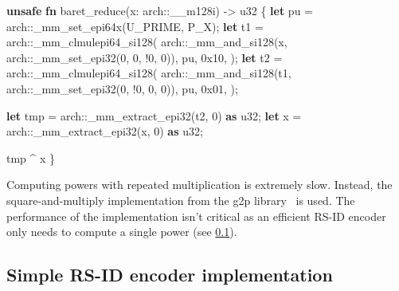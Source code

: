 \documentclass[
]{article}
\newenvironment{Shaded}{}{}
\newcommand{\DataTypeTok}[1]{\textcolor[rgb]{0.56,0.13,0.00}{#1}}
\newcommand{\DecValTok}[1]{\textcolor[rgb]{0.25,0.63,0.44}{#1}}
\newcommand{\KeywordTok}[1]{\textcolor[rgb]{0.00,0.44,0.13}{\textbf{#1}}}
\newcommand{\NormalTok}[1]{#1}
\newcommand{\OperatorTok}[1]{\textcolor[rgb]{0.40,0.40,0.40}{#1}}
\newcommand{\PreprocessorTok}[1]{\textcolor[rgb]{0.74,0.48,0.00}{#1}}
\begin{document}
\begin{Shaded}
\begin{Highlighting}[]
\KeywordTok{unsafe} \KeywordTok{fn}\NormalTok{ baret\_reduce(x}\OperatorTok{:} \PreprocessorTok{arch::}\NormalTok{\_\_m128i) }\OperatorTok{{-}\textgreater{}} \DataTypeTok{u32} \OperatorTok{\{}
    \KeywordTok{let}\NormalTok{ pu }\OperatorTok{=} \PreprocessorTok{arch::}\NormalTok{\_mm\_set\_epi64x(U\_PRIME}\OperatorTok{,}\NormalTok{ P\_X)}\OperatorTok{;}
    \KeywordTok{let}\NormalTok{ t1 }\OperatorTok{=} \PreprocessorTok{arch::}\NormalTok{\_mm\_clmulepi64\_si128(}
        \PreprocessorTok{arch::}\NormalTok{\_mm\_and\_si128(x}\OperatorTok{,} \PreprocessorTok{arch::}\NormalTok{\_mm\_set\_epi32(}\DecValTok{0}\OperatorTok{,} \DecValTok{0}\OperatorTok{,} \OperatorTok{!}\DecValTok{0}\OperatorTok{,} \DecValTok{0}\NormalTok{))}\OperatorTok{,}
\NormalTok{        pu}\OperatorTok{,}
        \DecValTok{0x10}\OperatorTok{,}
\NormalTok{    )}\OperatorTok{;}
    \KeywordTok{let}\NormalTok{ t2 }\OperatorTok{=} \PreprocessorTok{arch::}\NormalTok{\_mm\_clmulepi64\_si128(}
        \PreprocessorTok{arch::}\NormalTok{\_mm\_and\_si128(t1}\OperatorTok{,} \PreprocessorTok{arch::}\NormalTok{\_mm\_set\_epi32(}\DecValTok{0}\OperatorTok{,} \OperatorTok{!}\DecValTok{0}\OperatorTok{,} \DecValTok{0}\OperatorTok{,} \DecValTok{0}\NormalTok{))}\OperatorTok{,}
\NormalTok{        pu}\OperatorTok{,}
        \DecValTok{0x01}\OperatorTok{,}
\NormalTok{    )}\OperatorTok{;}

    \KeywordTok{let}\NormalTok{ tmp }\OperatorTok{=} \PreprocessorTok{arch::}\NormalTok{\_mm\_extract\_epi32(t2}\OperatorTok{,} \DecValTok{0}\NormalTok{) }\KeywordTok{as} \DataTypeTok{u32}\OperatorTok{;}
    \KeywordTok{let}\NormalTok{ x }\OperatorTok{=} \PreprocessorTok{arch::}\NormalTok{\_mm\_extract\_epi32(x}\OperatorTok{,} \DecValTok{0}\NormalTok{) }\KeywordTok{as} \DataTypeTok{u32}\OperatorTok{;}

\NormalTok{    tmp }\OperatorTok{\^{}}\NormalTok{ x}
\OperatorTok{\}}
\end{Highlighting}
\end{Shaded}

Computing powers with repeated multiplication is extremely slow.
Instead, the square-and-multiply implementation from the g2p library~\cite{g2p} is used. The performance of the implementation isn't critical as an
efficient RS-ID encoder only needs to compute a single power (see \cref{simple-rs-id-encoder-implementation}).

\hypertarget{simple-rs-id-encoder-implementation}{%
\subsection{Simple RS-ID encoder
implementation}\label{simple-rs-id-encoder-implementation}}
\end{document}
